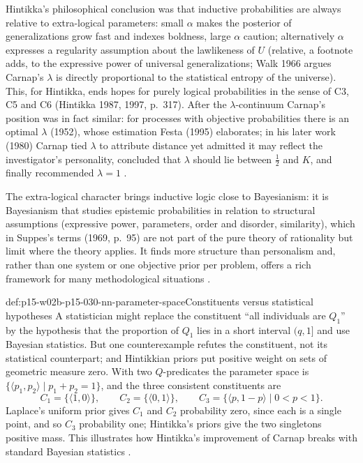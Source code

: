 Hintikka's philosophical conclusion was that inductive probabilities are
always relative to extra-logical parameters: small \(\alpha\) makes the
posterior of generalizations grow fast and indexes boldness, large \(\alpha\)
caution; alternatively \(\alpha\) expresses a regularity assumption about the
lawlikeness of \(U\) (relative, a footnote adds, to the expressive power of
universal generalizations; Walk 1966 argues Carnap's \(\lambda\) is directly
proportional to the statistical entropy of the universe). This, for
Hintikka, ends hopes for purely logical probabilities in the sense of C3,
C5 and C6 (Hintikka 1987, 1997, p.~317). After the \(\lambda\)-continuum
Carnap's position was in fact similar: for processes with objective
probabilities there is an optimal \(\lambda\) (1952), whose estimation Festa
(1995) elaborates; in his later work (1980) Carnap tied \(\lambda\) to
attribute distance yet admitted it may reflect the investigator's
personality, concluded that \(\lambda\) should lie between \(\tfrac12\) and
\(K\), and finally recommended \(\lambda=1\)
\cite[p.~349 and n.~12]{Niiniluoto2011HintikkaProgramReading}.

The extra-logical character brings inductive logic close to Bayesianism:
it is Bayesianism that studies epistemic probabilities in relation to
structural assumptions (expressive power, parameters, order and disorder,
similarity), which in Suppes's terms (1969, p.~95) are not part of the pure
theory of rationality but limit where the theory applies. It finds more
structure than personalism and, rather than one system or one objective
prior per problem, offers a rich framework for many methodological
situations \cite[pp.~349--350]{Niiniluoto2011HintikkaProgramReading}.

\begin{hbexample}{def:p15-w02b-p15-030-nn-parameter-space}{Constituents versus statistical hypotheses}
A statistician might replace the constituent ``all individuals are \(Q_1\)''
by the hypothesis that the proportion of \(Q_1\) lies in a short interval
\((q,1]\) and use Bayesian statistics. But one counterexample refutes the
constituent, not its statistical counterpart; and Hintikkian priors put
positive weight on sets of geometric measure zero. With two
\(Q\)-predicates the parameter space is \(\{\langle p_1,p_2\rangle\mid
p_1+p_2=1\}\), and the three consistent constituents are
\[
 C_1=\{\langle1,0\rangle\},\qquad C_2=\{\langle0,1\rangle\},\qquad
 C_3=\{\langle p,1-p\rangle\mid0<p<1\}.
\]
Laplace's uniform prior gives \(C_1\) and \(C_2\) probability zero, since
each is a single point, and so \(C_3\) probability one; Hintikka's priors
give the two singletons positive mass. This illustrates how Hintikka's
improvement of Carnap breaks with standard Bayesian statistics
\cite[p.~350]{Niiniluoto2011HintikkaProgramReading}.
\end{hbexample}


